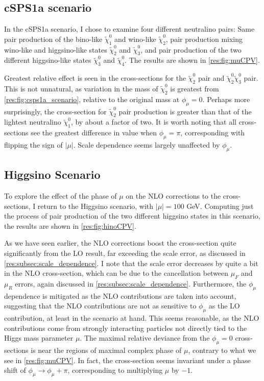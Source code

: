 \documentclass[../main.tex]{subfiles}
\begin{document}
\subsection{cSPS1a scenario}
In the cSPS1a scenario, I chose to examine four different neutralino pairs:
Same pair production of the bino-like \(\tilde\chi^0_1\) and wino-like \(\tilde\chi^0_2\), pair production mixing wino-like and higgsino-like states \(\tilde\chi^0_2\) and \(\tilde\chi^0_3\), and pair production of the two different higgsino-like states \(\tilde\chi^0_3\) and \(\tilde\chi^0_4\).
The results are shown in \cref{res:fig:muCPV}.

Greatest relative effect is seen in the cross-sections for the \(\tilde\chi^0_2\) pair and \(\tilde\chi^0_2 \tilde\chi^0_3\) pair.
This is not unnatural, as variation in the mass of \(\tilde\chi^0_2\) is greatest from \cref{res:fig:csps1a_scenario}, relative to the original mass at \(\phi_\mu = 0\).
Perhaps more surprisingly, the cross-section for \(\tilde\chi^0_2\) pair production is greater than that of the lightest neutralino \(\tilde\chi^0_1\), by about a factor of two.
It is worth noting that all cross-sections see the greatest difference in value when \(\phi_\mu = \pi\), corresponding with flipping the sign of \(|\mu|\).
Scale dependence seems largely unaffected by \(\phi_\mu\).


\subsection{Higgsino Scenario}
To explore the effect of the phase of \(\mu\) on the NLO corrections to the cross-sections, I return to the Higgsino scenario, with \(|\mu| = 100\) GeV.
Computing just the process of pair production of the two different higgsino states in this scenario, the results are shown in \cref{res:fig:hinoCPV}.

As we have seen earlier, the NLO corrections boost the cross-section quite significantly from the LO result, far exceeding the scale error, as discussed in \cref{res:subsec:scale_dependence}.
I note that the scale error decreases by quite a bit in the NLO cross-section, which can be due to the cancellation between \(\mu_F\) and \(\mu_R\) errors, again discussed in \cref{res:subsec:scale_dependence}.
Furthermore, the \(\phi_\mu\) dependence is mitigated as the NLO contributions are taken into account, suggesting that the NLO contributions are not as sensitive to \(\phi_\mu\) as the LO contribution, at least in the scenario at hand.
This seems reasonable, as the NLO contributions come from strongly interacting particles not directly tied to the Higgs mass parameter \(\mu\).
The maximal relative deviance from the \(\phi_\mu = 0\) cross-sections is near the regions of maximal complex phase of \(\mu\), contrary to what we see in \cref{res:fig:muCPV}.
In fact, the cross-section seems invariant under a phase shift of \(\phi_\mu \to \phi_\mu + \pi\), corresponding to multiplying \(\mu\) by \(-1\).
\end{document}
